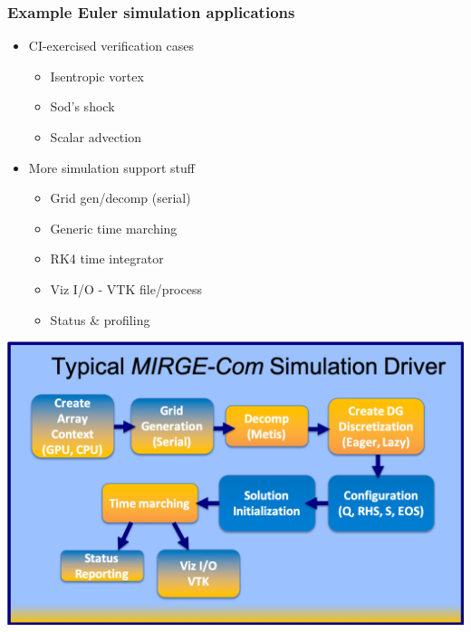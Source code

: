\begin{frame}\frametitle{Example Euler simulation applications}
\begin{multicols}{2}
  \begin{itemize}
  \item CI-exercised verification cases 
    \begin{itemize}
    \item Isentropic vortex
    \item Sod's shock
    \item Scalar advection
    \end{itemize}
  \item More simulation support stuff
    \begin{itemize}
    \item Grid gen/decomp (serial)
    \item Generic time marching
    \item RK4 time integrator 
    \item Viz I/O - VTK file/process
    \item Status \& profiling 
    \end{itemize}
\end{itemize}
\end{multicols}
\begin{center}
  \includegraphics[width=.7\textwidth]{figures/mtc/TypicalDriver2.png}
\end{center}
\end{frame}

